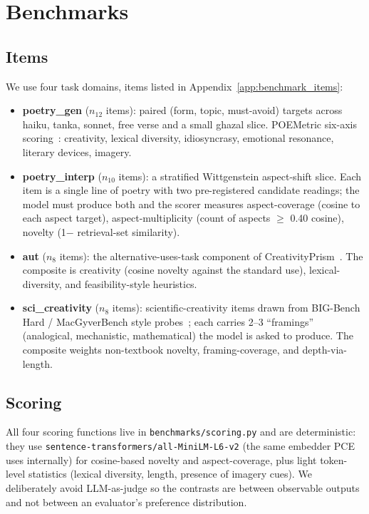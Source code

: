 \section{Benchmarks}\label{sec:benchmarks}

\subsection{Items}

We use four task domains, items listed in Appendix~\ref{app:benchmark_items}:

\begin{itemize}[leftmargin=1.4em]
\item \textbf{poetry\_gen} ($n_{\text{12}}$ items): paired (form, topic, must-avoid) targets across haiku, tanka, sonnet, free verse and a small ghazal slice. POEMetric six-axis scoring~\citep{Ye2025POEMetric}: creativity, lexical diversity, idiosyncrasy, emotional resonance, literary devices, imagery.
\item \textbf{poetry\_interp} ($n_{\text{10}}$ items): a stratified Wittgenstein aspect-shift slice. Each item is a single line of poetry with two pre-registered candidate readings; the model must produce both and the scorer measures aspect-coverage (cosine to each aspect target), aspect-multiplicity (count of aspects $\geq$ 0.40 cosine), novelty (1$-$ retrieval-set similarity).
\item \textbf{aut} ($n_{\text{8}}$ items): the alternative-uses-task component of CreativityPrism~\citep{CreativityPrism2025}. The composite is creativity (cosine novelty against the standard use), lexical-diversity, and feasibility-style heuristics.
\item \textbf{sci\_creativity} ($n_{\text{8}}$ items): scientific-creativity items drawn from BIG-Bench Hard / MacGyverBench style probes~\citep{Suzgun2022BBH,Tian2024MacGyverBench}; each carries 2--3 ``framings'' (analogical, mechanistic, mathematical) the model is asked to produce. The composite weights non-textbook novelty, framing-coverage, and depth-via-length.
\end{itemize}

\subsection{Scoring}

All four scoring functions live in \texttt{benchmarks/scoring.py} and are deterministic: they use \texttt{sentence-transformers/all-MiniLM-L6-v2} (the same embedder PCE uses internally) for cosine-based novelty and aspect-coverage, plus light token-level statistics (lexical diversity, length, presence of imagery cues). We deliberately avoid LLM-as-judge so the contrasts are between observable outputs and not between an evaluator's preference distribution.

